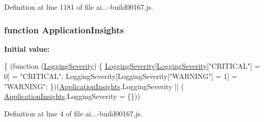 Definition at line 1181 of file ai...-\/build00167.\+js.

\subsubsection[{\texorpdfstring{Application\+Insights}{ApplicationInsights}}]{\setlength{\rightskip}{0pt plus 5cm}function Application\+Insights}\hypertarget{_scripts_2ai_80_822_89-build00167_8js_aa415ef4f8cdd699689ef4b61db7656d8}{}\label{_scripts_2ai_80_822_89-build00167_8js_aa415ef4f8cdd699689ef4b61db7656d8}
{\bfseries Initial value\+:}
\begin{DoxyCode}
\{
        (\textcolor{keyword}{function} (\hyperlink{obj_2_release_2_package_2_package_tmp_2_scripts_2ai_80_822_89-build00167_8js_a7c9dc87e469261dd3cdf56090107bebc}{LoggingSeverity}) \{
            \hyperlink{obj_2_release_2_package_2_package_tmp_2_scripts_2ai_80_822_89-build00167_8js_a7c9dc87e469261dd3cdf56090107bebc}{LoggingSeverity}[\hyperlink{obj_2_release_2_package_2_package_tmp_2_scripts_2ai_80_822_89-build00167_8js_a7c9dc87e469261dd3cdf56090107bebc}{LoggingSeverity}[\textcolor{stringliteral}{"CRITICAL"}] = 0] = \textcolor{stringliteral}{"CRITICAL"};
            LoggingSeverity[LoggingSeverity[\textcolor{stringliteral}{"WARNING"}] = 1] = \textcolor{stringliteral}{"WARNING"};
        \})(\hyperlink{obj_2_release_2_package_2_package_tmp_2_scripts_2ai_80_822_89-build00167_8js_aa415ef4f8cdd699689ef4b61db7656d8}{ApplicationInsights}.LoggingSeverity || (
      \hyperlink{obj_2_release_2_package_2_package_tmp_2_scripts_2ai_80_822_89-build00167_8js_aa415ef4f8cdd699689ef4b61db7656d8}{ApplicationInsights}.LoggingSeverity = \{\}))
\end{DoxyCode}


Definition at line 4 of file ai...-\/build00167.\+js.

